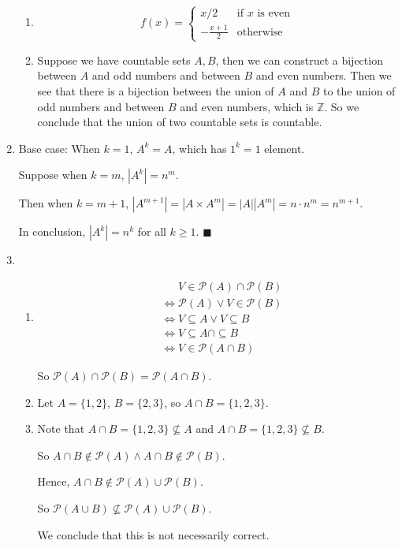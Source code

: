 \documentclass[11pt]{article}
\begin{document}
\begin{enumerate}
			\begin{enumerate}
				\item 
				\[f(x) = 
				\begin{cases}
					x / 2 & \text{if $x$ is even}\\
					-\frac{x + 1}{2} & \text{otherwise}
				\end{cases} \]
				\item Suppose we have countable sets $A, B$, then we can construct a bijection between $A$ and odd numbers and between $B$ and even numbers. Then we see that there is a bijection between the union of $A$ and $B$ to the union of odd numbers and between $B$ and even numbers, which is $\mathbb{Z}$. So we conclude that the union of two countable sets is countable.
			\end{enumerate}
			\item Base case: When $k = 1$, $A^k = A$, which has $1^k = 1$ element.
			
			Suppose when $k = m$, $|A^k| = n^m$.
			
			Then when $k = m + 1$, $|A^{m + 1}| = |A\times A^m| = |A||A^m| = n\cdot n^m = n^{m + 1}$.
			
			In conclusion, $|A^k| = n^k$ for all $k \geq 1$.
			$\blacksquare$
			\item
			\begin{enumerate}[(1).]
				\item
				\begin{align}
					&\phantom{\Leftrightarrow}V \in \mathcal{P}(A) \cap \mathcal{P}(B)\nonumber\\
					&\Leftrightarrow \mathcal{P}(A) \vee V \in \mathcal{P}(B)\nonumber\\
					&\Leftrightarrow V \subseteq A \vee V \subseteq B\nonumber\\
					&\Leftrightarrow V \subseteq A \cap \subseteq B\nonumber\\
					&\Leftrightarrow V \in \mathcal{P}(A \cap B)\nonumber
				\end{align}
				
				So $\mathcal{P}(A) \cap \mathcal{P}(B) = \mathcal{P}(A \cap B)$.
				\item Let $A = \{1, 2\}$, $B = \{2, 3\}$, so $A \cap B = \{1, 2, 3\}$. 
				\item 
				Note that $A \cap B = \{1, 2, 3\} \not\subseteq A$ and $A \cap B = \{1, 2, 3\} \not\subseteq B$.

				So $A \cap B \not\in \mathcal{P}(A) \wedge A \cap B \not\in \mathcal{P}(B)$.
				
				Hence, $A \cap B \not\in \mathcal{P}(A) \cup \mathcal{P}(B)$.
				
				So $\mathcal{P}(A \cup B) \not\subseteq \mathcal{P}(A) \cup \mathcal{P}(B)$.
				
				We conclude that this is not necessarily correct.
			\end{enumerate}
	\end{enumerate}
\end{document}
